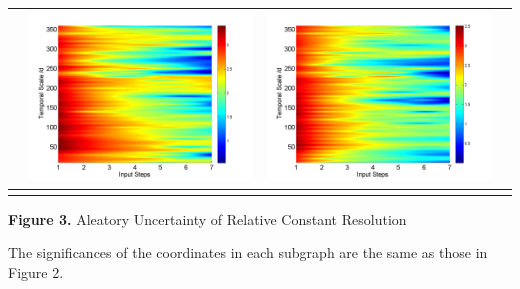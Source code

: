 \documentclass[draft,wrr]{AGUTeX}
\begin{document}
\begin{article}
\begin{table}[H]
\begin{tabular}{cccc}
&\begin{minipage}{.3\textwidth}\includegraphics[width=\linewidth]{resultgraph/06810000pep_rela.png}\end{minipage}
&\begin{minipage}{.3\textwidth}\includegraphics[width=\linewidth]{resultgraph/06810000pepq_rela.png}\end{minipage}
\\
\hline
\\
\end{tabular}

\Large{\textbf{Figure 3.} Aleatory Uncertainty of Relative Constant Resolution}
\end{table}
The significances of the coordinates in each subgraph are the same as those in Figure 2.


\end{article}
\end{document}
